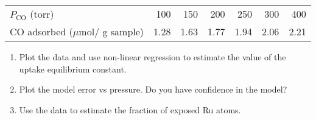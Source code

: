 \documentclass[11pt]{article}
\begin{document}
\begin{center}
\begin{tabular}{lrrrrrr}
\(P_\text{CO}\)  (torr) & 100 & 150 & 200 & 250 & 300 & 400\\
CO adsorbed (\(\mu\)mol/ g sample) & 1.28 & 1.63 & 1.77 & 1.94 & 2.06 & 2.21\\
\end{tabular}
\end{center}

\begin{enumerate}
\item Plot the data and use non-linear regression to estimate the value of the uptake equilibrium constant.
\item Plot the model error vs pressure. Do you have confidence in the model?
\item Use the data to estimate the fraction of exposed Ru atoms.
\end{enumerate}
\end{document}
